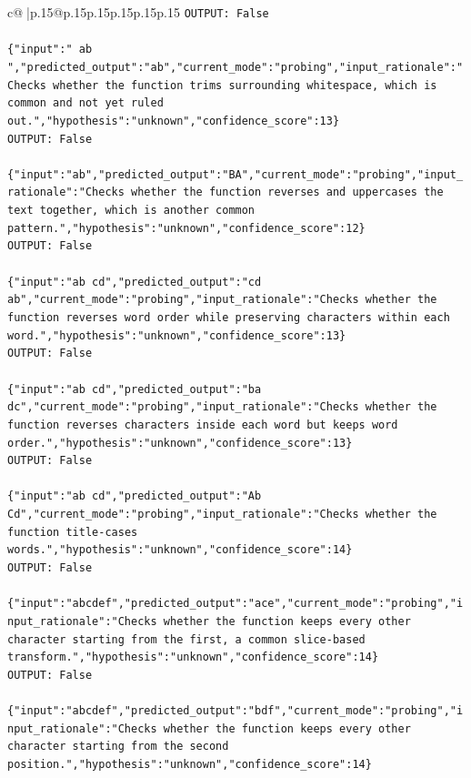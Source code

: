 \documentclass{article}
\begin{document}
{\begin{supertabular}{c@{$\;$}|p{.15\linewidth}@{}p{.15\linewidth}p{.15\linewidth}p{.15\linewidth}p{.15\linewidth}p{.15\linewidth}}
{{{\texttt{OUTPUT: False} \\
\\ 
\texttt{\{"input":" ab ","predicted\_output":"ab","current\_mode":"probing","input\_rationale":"Checks whether the function trims surrounding whitespace, which is common and not yet ruled out.","hypothesis":"unknown","confidence\_score":13\}} \\
\texttt{OUTPUT: False} \\
\\ 
\texttt{\{"input":"ab","predicted\_output":"BA","current\_mode":"probing","input\_rationale":"Checks whether the function reverses and uppercases the text together, which is another common pattern.","hypothesis":"unknown","confidence\_score":12\}} \\
\texttt{OUTPUT: False} \\
\\ 
\texttt{\{"input":"ab cd","predicted\_output":"cd ab","current\_mode":"probing","input\_rationale":"Checks whether the function reverses word order while preserving characters within each word.","hypothesis":"unknown","confidence\_score":13\}} \\
\texttt{OUTPUT: False} \\
\\ 
\texttt{\{"input":"ab cd","predicted\_output":"ba dc","current\_mode":"probing","input\_rationale":"Checks whether the function reverses characters inside each word but keeps word order.","hypothesis":"unknown","confidence\_score":13\}} \\
\texttt{OUTPUT: False} \\
\\ 
\texttt{\{"input":"ab cd","predicted\_output":"Ab Cd","current\_mode":"probing","input\_rationale":"Checks whether the function title{-}cases words.","hypothesis":"unknown","confidence\_score":14\}} \\
\texttt{OUTPUT: False} \\
\\ 
\texttt{\{"input":"abcdef","predicted\_output":"ace","current\_mode":"probing","input\_rationale":"Checks whether the function keeps every other character starting from the first, a common slice{-}based transform.","hypothesis":"unknown","confidence\_score":14\}} \\
\texttt{OUTPUT: False} \\
\\ 
\texttt{\{"input":"abcdef","predicted\_output":"bdf","current\_mode":"probing","input\_rationale":"Checks whether the function keeps every other character starting from the second position.","hypothesis":"unknown","confidence\_score":14\}} \\
}}}
\end{supertabular}}
\end{document}
